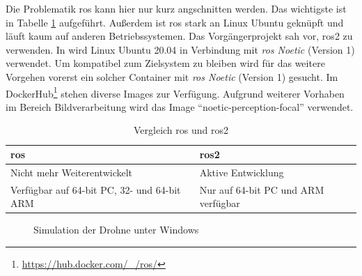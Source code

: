 Die Problematik \acrshort{ros} kann hier nur kurz angschnitten werden. Das wichtigste ist in Tabelle \ref{tab:cmp_ros} aufgeführt. Außerdem ist \acrshort{ros} stark an Linux Ubuntu geknüpft und läuft kaum auf anderen Betriebssystemen. Das Vorgängerprojekt sah vor, \acrshort{ros}2 zu verwenden\cite[Kapitel 6.6]{wirthErweiterungBestehendenDrohne2022a}. In \cite{dronecodestiftungObstacleDetectionAvoidance2023} wird Linux Ubuntu 20.04 in Verbindung mit \textit{\acrshort{ros} Noetic} (Version 1) verwendet. Um kompatibel zum Zielsystem zu bleiben wird für das weitere Vorgehen vorerst ein solcher Container mit \textit{\acrshort{ros} Noetic} (Version 1) gesucht. Im DockerHub\footnote{\url{https://hub.docker.com/_/ros/}\cite{dronecodestiftungRosOfficialImage}} stehen diverse Images zur Verfügung. Aufgrund weiterer Vorhaben im Bereich Bildverarbeitung wird das Image \enquote{noetic-perception-focal} verwendet.
\begin{table}[h]
    \begin{minipage}{\linewidth}
    \caption{Vergleich \acrshort{ros} und \acrshort{ros}2}
    \centering
    \label{tab:cmp_ros}
    \begin{tabularx}{\textwidth}{X | X}
        \acrshort{ros} & \acrshort{ros}2 \\
        \hline
        Nicht mehr Weiterentwickelt & Aktive Entwicklung\\
        Verfügbar auf 64-bit PC, 32- und 64-bit ARM & Nur auf 64-bit PC und ARM verfügbar\\
    \end{tabularx}
\end{minipage}
\end{table}

\begin{figure}[h!]
    \centering
    \caption{Simulation der Drohne unter Windows}
    \label{fig:app_sim}
\end{figure}

